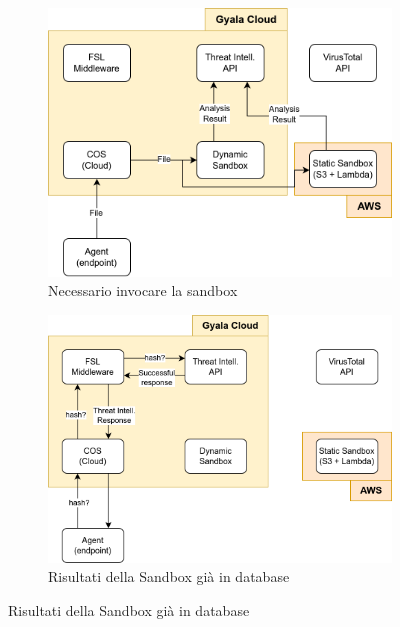 \begin{figure}
    \centering
    \begin{subfigure}[b]{0.48\textwidth}
        \centering
        \includegraphics[width=\textwidth]{assets/fsl_general_arch_sandbox_invoke.png}
        \caption{Necessario invocare la sandbox}
        \label{fig:fsl_general_arch_sandbox_invoke}
    \end{subfigure}
    \begin{subfigure}[b]{0.48\textwidth}
        \centering
        \includegraphics[width=\textwidth]{assets/fsl_general_arch_sandbox_cached.png}
        \caption{Risultati della Sandbox già in database}
        \label{fig:fsl_general_arch_sandbox_cached}
    \end{subfigure}

\end{figure}
